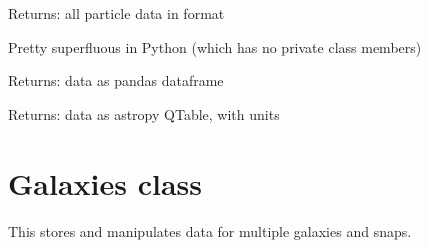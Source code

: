 \documentclass[letterpaper,10pt,english]{sphinxmanual}
\begin{document}
\begin{fulllineitems}
\begin{fulllineitems}
\begin{description}
\end{description}

\end{fulllineitems}


\begin{fulllineitems}
\label{\detokenize{galaxy:galaxy.galaxy.Galaxy.get_array}}
Returns: all particle data in  format

Pretty superfluous in Python (which has no private class members)

\end{fulllineitems}


\begin{fulllineitems}
\label{\detokenize{galaxy:galaxy.galaxy.Galaxy.get_df}}
Returns: data as pandas dataframe

\end{fulllineitems}


\begin{fulllineitems}
\label{\detokenize{galaxy:galaxy.galaxy.Galaxy.get_qtable}}
Returns: data as astropy QTable, with units

\end{fulllineitems}


\end{fulllineitems}

\label{\detokenize{galaxies:module-galaxy.galaxies}}

\chapter{Galaxies class}
\label{\detokenize{galaxies:galaxies-class}}\label{\detokenize{galaxies::doc}}
This stores and manipulates data for multiple galaxies and snaps.
\end{document}
